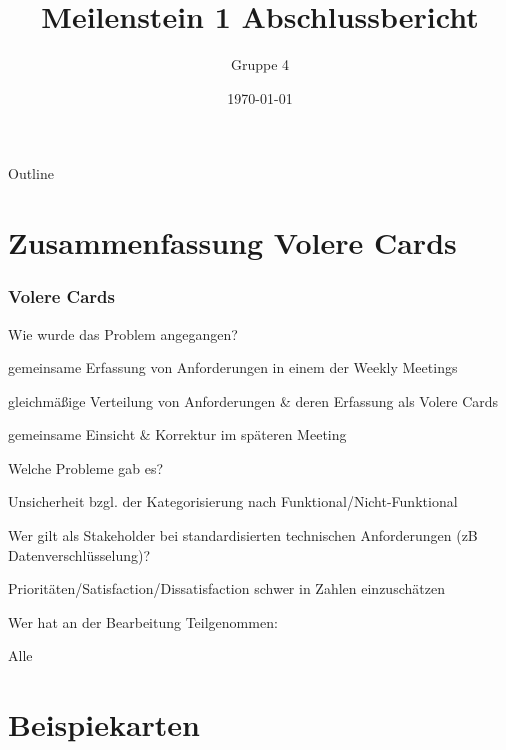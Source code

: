 \documentclass{beamer}
\title{Meilenstein 1 Abschlussbericht}
\author{Gruppe 4}
\date{\today}
\institute{TU Chemnitz}
\begin{document}
\begin{titlepage}


\end{titlepage}

\begin{frame}{Outline}
    \tableofcontents
\end{frame}

\section{Zusammenfassung Volere Cards}
\begin{frame}
    \frametitle{Volere Cards}
    Wie wurde das Problem angegangen?
    \begin{description}[font=$\bullet$]
        \item gemeinsame Erfassung von Anforderungen in einem der Weekly Meetings
        \item gleichmäßige Verteilung von Anforderungen \& deren Erfassung als Volere Cards
        \item gemeinsame Einsicht \& Korrektur im späteren Meeting
    \end{description}

\end{frame}
\begin{frame}
    Welche Probleme gab es?

    \begin{description}[font=$\bullet$]
        \item Unsicherheit bzgl. der Kategorisierung nach Funktional/Nicht-Funktional
        \item Wer gilt als Stakeholder bei standardisierten technischen Anforderungen (zB Datenverschlüsselung)?
        \item Prioritäten/Satisfaction/Dissatisfaction schwer in Zahlen einzuschätzen
    \end{description}

    Wer hat an der Bearbeitung Teilgenommen:
    \begin{description}[font=$\bullet$]
        \item Alle
    \end{description}
\end{frame}
\section{Beispiekarten}

\begingroup
\fontsize{8px}{12pt}\selectfont
\begin{frame}
    
\end{frame}
\begin{frame}
    
\end{frame}
\begin{frame}
    
\end{frame}
\begin{frame}
    
\end{frame}
\begin{frame}
    
\end{frame}
\endgroup
\end{document}
